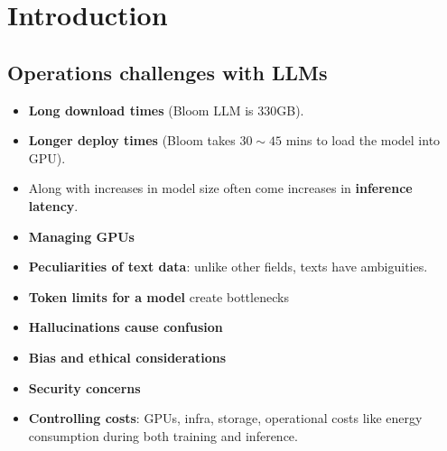 \chapter{Introduction}

\section{Operations challenges with LLMs}
\begin{itemize}
	\item \textbf{Long download times} (\eg Bloom LLM is 330GB).
	\item \textbf{Longer deploy times} (\eg Bloom takes $30\sim 45$ mins to load the model into GPU).
	\item Along with increases in model size often come increases in \textbf{inference latency}. 
	\item \textbf{Managing GPUs}
	\item \textbf{Peculiarities of text data}: unlike other fields, texts have ambiguities. 
	\item \textbf{Token limits for a model} create bottlenecks
	\item \textbf{Hallucinations cause confusion} 
	\item \textbf{Bias and ethical considerations}
	\item \textbf{Security concerns}
	\item \textbf{Controlling costs}: \eg GPUs, infra, storage, operational costs like energy consumption during both training and inference. 
\end{itemize}

